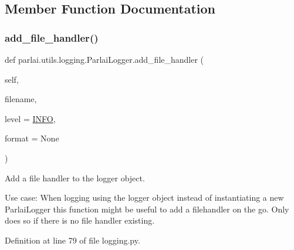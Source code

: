 \subsection{Member Function Documentation}
\mbox{\label{classparlai_1_1utils_1_1logging_1_1ParlaiLogger_abaeed79f85f8b00792bcb3557f955e9e}} 
\subsubsection{\texorpdfstring{add\+\_\+file\+\_\+handler()}{add\_file\_handler()}}
{\footnotesize\ttfamily def parlai.\+utils.\+logging.\+Parlai\+Logger.\+add\+\_\+file\+\_\+handler (\begin{DoxyParamCaption}\item[{}]{self,  }\item[{}]{filename,  }\item[{}]{level = {\ttfamily \hyperlink{namespaceparlai_1_1utils_1_1logging_a4bc2de74317465e5d1a8b5d7b913d48a}{I\+N\+FO}},  }\item[{}]{format = {\ttfamily None} }\end{DoxyParamCaption})}

\begin{DoxyVerb}Add a file handler to the logger object.

Use case: When logging using the logger object instead of instantiating a new
ParlaiLogger           this function might  be useful to add a filehandler on
the go. Only does so if there is no file handler existing.
\end{DoxyVerb}
 

Definition at line 79 of file logging.\+py.


